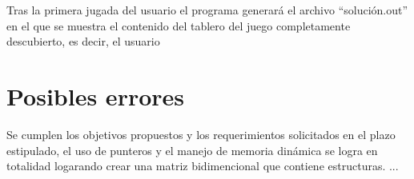 \documentclass[letterpaper,12pt]{report}
\begin{document}
Tras la primera jugada del usuario el programa generará el archivo ``solución.out'' en el que se muestra el contenido del tablero del juego completamente descubierto, es decir, el usuario 

\chapter{Posibles errores}


Se cumplen los objetivos propuestos y los requerimientos solicitados en el plazo estipulado, el uso de punteros y el manejo de memoria dinámica se logra en totalidad logarando crear una matriz bidimencional que contiene estructuras. ...
\end{document}

